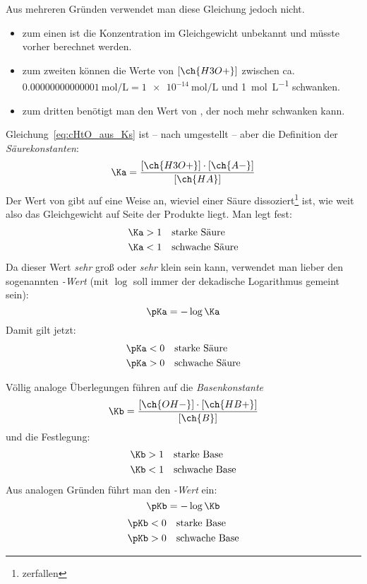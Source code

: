 \documentclass{scrartcl}
\begin{document}
Aus mehreren Gründen verwendet man diese Gleichung jedoch nicht.
\begin{itemize}
  \item zum einen ist die Konzentration im Gleichgewicht unbekannt und müsste
    vorher berechnet werden.
  \item zum zweiten können die Werte von $[\ch{H3O+}]$ zwischen
    ca. $\SI{0.00000000000001}{\mole\per\liter} = \SI{1e-14}{\mole\per\liter}$ und
    \SI{1}{\mole\per\liter} schwanken.
  \item zum dritten benötigt man den Wert von \Ka, der noch mehr schwanken
    kann.
\end{itemize}
Gleichung~\eqref{eq:cHtO_aus_Ks} ist -- nach \Ka umgestellt -- aber die
Definition der \emph{Säurekonstanten}:
\begin{equation}
  \Ka = \frac{ [\ch{H3O+}] \cdot [\ch{A-}] }{ [\ch{HA}] } \label{eq:Ks_definition}
\end{equation}
Der Wert von \Ka gibt auf eine Weise an, wieviel einer Säure
dissoziert\footnote{zerfallen} ist, wie weit also das Gleichgewicht auf Seite
der Produkte liegt.  Man legt fest:
\begin{align*}
  \Ka &>1 \quad\text{starke Säure} \\
  \Ka &<1 \quad\text{schwache Säure}
\end{align*}
Da dieser Wert \emph{sehr} groß oder \emph{sehr} klein sein kann, verwendet
man lieber den sogenannten \emph{\pKa-Wert} (mit $\log$ soll immer der
dekadische Logarithmus gemeint sein):
\begin{equation}
  \pKa = -\log\Ka
\end{equation}
Damit gilt jetzt:
\begin{align*}
  \pKa &<0 \quad\text{starke Säure} \\
  \pKa &>0 \quad\text{schwache Säure}
\end{align*}

Völlig analoge Überlegungen führen auf die \emph{Basenkonstante}
\begin{equation}
  \Kb = \frac{ [\ch{OH-}] \cdot [\ch{HB+}] }{ [\ch{B}] } \label{eq:Kb_definition}
\end{equation}
und die Festlegung:
\begin{align*}
  \Kb &>1 \quad\text{starke Base} \\
  \Kb &<1 \quad\text{schwache Base}
\end{align*}
Aus analogen Gründen führt man den \emph{\pKb-Wert} ein:
\begin{equation}
  \pKb = -\log\Kb
\end{equation}
\begin{align*}
  \pKb &<0 \quad\text{starke Base} \\
  \pKb &>0 \quad\text{schwache Base}
\end{align*}
\end{document}

